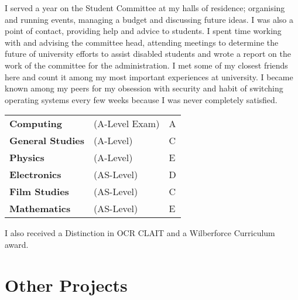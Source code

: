 \documentclass[10pt,a4paper]{moderncv}
\begin{document}
{I served a year on the Student Committee at my halls of residence; organising and running events, managing a budget and discussing future ideas. I was also a point of contact, providing help and advice to students.}
{I spent time working with and advising the committee head, attending meetings to determine the future of university efforts to assist disabled students and wrote a report on the work of the committee for the administration.}
{I met some of my closest friends here and count it among my most important experiences at university. I became known among my peers for my obsession with security and habit of switching operating systems every few weeks because I was never completely satisfied.
\newline{}
}

{
\begin{tabularx}{\textwidth}{ X X X }
\textbf{Computing} & (A-Level Exam) & A\\
\textbf{General Studies} & (A-Level) & C\\
\textbf{Physics} & (A-Level) & E\\
\textbf{Electronics} & (AS-Level) & D\\
\textbf{Film Studies} & (AS-Level) & C\\
\textbf{Mathematics} & (AS-Level) & E\\
\end{tabularx}
\newline{}\newline{}
I also received a Distinction in OCR CLAIT and a Wilberforce Curriculum award.
\newline{}
}

\section{Other Projects}
\small{}
\small{}
\small{}
\end{document}
